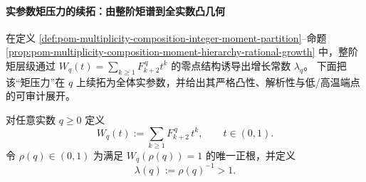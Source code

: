 \paragraph{实参数矩压力的续拓：由整阶矩谱到全实数凸几何}\label{par:pom-multiplicity-real-q-pressure}
在定义 \ref{def:pom-multiplicity-composition-integer-moment-partition}--命题 \ref{prop:pom-multiplicity-composition-moment-hierarchy-rational-growth} 中，整阶矩层级通过
\(
W_q(t)=\sum_{k\ge 1}F_{k+2}^{\,q}t^k
\)
的零点结构诱导出增长常数 \(\lambda_q\)。
下面把该“矩压力”在 \(q\) 上续拓为全体实参数，并给出其严格凸性、解析性与低/高温端点的可审计展开。

\begin{definition}[实参数矩压力与主根]\label{def:pom-multiplicity-real-q-pressure}
对任意实数 \(q\ge 0\) 定义
\[
W_q(t):=\sum_{k\ge 1}F_{k+2}^{\,q}\,t^k,\qquad t\in(0,1).
\]
令 \(\rho(q)\in(0,1)\) 为满足 \(W_q(\rho(q))=1\) 的唯一正根，并定义
\[
\boxed{\;\lambda(q):=\rho(q)^{-1}>1.\;}
\]
\end{definition}

